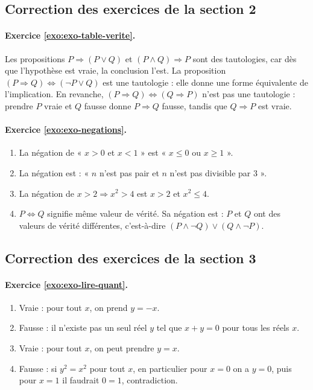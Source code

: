 \documentclass[11pt,a4paper]{article}
\begin{document}
\subsection*{Correction des exercices de la section 2}

\paragraph{Exercice \ref{exo:exo-table-verite}.}
Les propositions $P\Rightarrow(P\lor Q)$ et $(P\land Q)\Rightarrow P$ sont des tautologies, car dès que l'hypothèse est vraie, la conclusion l'est. La proposition $(P\Rightarrow Q)\Longleftrightarrow(\neg P\lor Q)$ est une tautologie : elle donne une forme équivalente de l'implication. En revanche, $(P\Rightarrow Q)\Longleftrightarrow(Q\Rightarrow P)$ n'est pas une tautologie : prendre $P$ vraie et $Q$ fausse donne $P\Rightarrow Q$ fausse, tandis que $Q\Rightarrow P$ est vraie.

\paragraph{Exercice \ref{exo:exo-negations}.}
\begin{enumerate}
  \item La négation de « $x>0$ et $x<1$ » est « $x\leq0$ ou $x\geq1$ ».
  \item La négation est : « $n$ n'est pas pair et $n$ n'est pas divisible par $3$ ».
  \item La négation de $x>2\Rightarrow x^2>4$ est $x>2$ et $x^2\leq4$.
  \item $P\Longleftrightarrow Q$ signifie même valeur de vérité. Sa négation est : $P$ et $Q$ ont des valeurs de vérité différentes, c'est-à-dire $(P\land\neg Q)\lor(Q\land\neg P)$.
\end{enumerate}

\subsection*{Correction des exercices de la section 3}

\paragraph{Exercice \ref{exo:exo-lire-quant}.}
\begin{enumerate}
  \item Vraie : pour tout $x$, on prend $y=-x$.
  \item Fausse : il n'existe pas un seul réel $y$ tel que $x+y=0$ pour tous les réels $x$.
  \item Vraie : pour tout $x$, on peut prendre $y=x$.
  \item Fausse : si $y^2=x^2$ pour tout $x$, en particulier pour $x=0$ on a $y=0$, puis pour $x=1$ il faudrait $0=1$, contradiction.
\end{enumerate}
\end{document}
